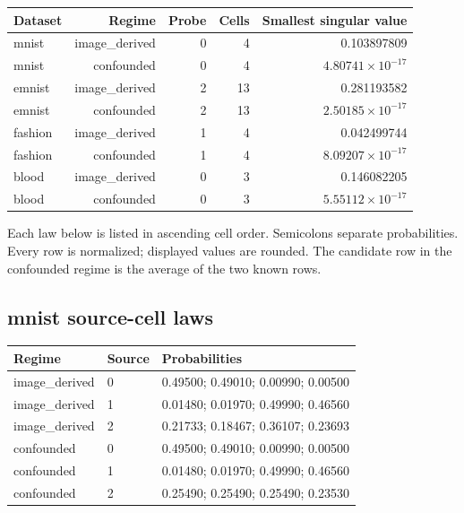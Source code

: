 \begingroup\small
\setlength{\tabcolsep}{4pt}
\begin{longtable}{lrrrr}
\toprule

Dataset & Regime & Probe & Cells & Smallest singular value\\\midrule\endhead

mnist & image\_derived & 0 & 4 & 0.103897809\\

mnist & confounded & 0 & 4 & $4.80741\times10^{-17}$\\

emnist & image\_derived & 2 & 13 & 0.281193582\\

emnist & confounded & 2 & 13 & $2.50185\times10^{-17}$\\

fashion & image\_derived & 1 & 4 & 0.042499744\\

fashion & confounded & 1 & 4 & $8.09207\times10^{-17}$\\

blood & image\_derived & 0 & 3 & 0.146082205\\

blood & confounded & 0 & 3 & $5.55112\times10^{-17}$\\

\bottomrule
\end{longtable}
\endgroup

Each law below is listed in ascending cell order. Semicolons separate probabilities. Every row is normalized; displayed values are rounded. The candidate row in the confounded regime is the average of the two known rows.

\reservetable
\subsection{mnist source-cell laws}

\begingroup\small
\setlength{\tabcolsep}{4pt}
\begin{longtable}{p{}p{}p{}}
\toprule

Regime & Source & Probabilities\\\midrule\endhead

image\_derived & 0 & 0.49500; 0.49010; 0.00990; 0.00500\\

image\_derived & 1 & 0.01480; 0.01970; 0.49990; 0.46560\\

image\_derived & 2 & 0.21733; 0.18467; 0.36107; 0.23693\\

confounded & 0 & 0.49500; 0.49010; 0.00990; 0.00500\\

confounded & 1 & 0.01480; 0.01970; 0.49990; 0.46560\\

confounded & 2 & 0.25490; 0.25490; 0.25490; 0.23530\\

\bottomrule
\end{longtable}
\endgroup

